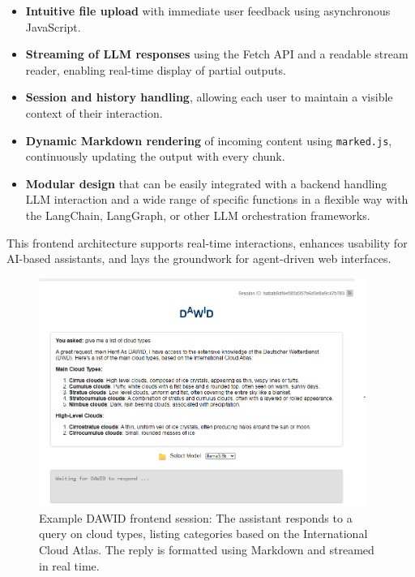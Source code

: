 \begin{itemize}
    \item \textbf{Intuitive file upload} with immediate user feedback using asynchronous JavaScript.
    \item \textbf{Streaming of LLM responses} using the Fetch API and a readable stream reader, enabling real-time display of partial outputs.
    \item \textbf{Session and history handling}, allowing each user to maintain a visible context of their interaction.
    \item \textbf{Dynamic Markdown rendering} of incoming content using \texttt{marked.js}, continuously updating the output with every chunk.
    \item \textbf{Modular design} that can be easily integrated with a backend handling LLM interaction and a wide range of specific functions in a flexible way with the LangChain, LangGraph, or other LLM orchestration frameworks.
\end{itemize}

This frontend architecture supports real-time interactions, enhances usability for AI-based assistants, and lays the groundwork for agent-driven web interfaces.

\begin{figure}[htbp]
    \centering
    \includegraphics[width=0.95\textwidth]{images/dawid_interface1.png}
    \caption{Example DAWID frontend session: The assistant responds to a query on cloud types, listing categories based on the International Cloud Atlas. The reply is formatted using Markdown and streamed in real time.}
    \label{fig:dawid-cloudtypes}
\end{figure}

